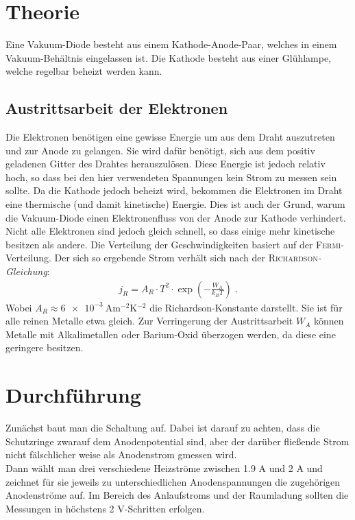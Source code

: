 \documentclass[12pt,a4paper,titlepage,headinclude,bibtotoc]{scrartcl}
\begin{document}
\cite{gerthsen}

\section{Theorie}
\label{sec:theorie}
Eine Vakuum-Diode besteht aus einem Kathode-Anode-Paar, welches in einem Vakuum-Behältnis eingelassen ist.
Die Kathode besteht aus einer Glühlampe, welche regelbar beheizt werden kann.
\subsection{Austrittsarbeit der Elektronen}
Die Elektronen benötigen eine gewisse Energie um aus dem Draht auszutreten und zur Anode zu gelangen.
Sie wird dafür benötigt, sich aus dem positiv geladenen Gitter des Drahtes herauszulösen.
Diese Energie ist jedoch relativ hoch, so dass bei den hier verwendeten Spannungen kein Strom zu messen sein sollte.
Da die Kathode jedoch beheizt wird, bekommen die Elektronen im Draht eine thermische (und damit kinetische) Energie.
Dies ist auch der Grund, warum die Vakuum-Diode einen Elektronenfluss von der Anode zur Kathode verhindert.
Nicht alle Elektronen sind jedoch gleich schnell, so dass einige mehr kinetische besitzen als andere.
Die Verteilung der Geschwindigkeiten basiert auf der \textsc{Fermi}-Verteilung.
Der sich so ergebende Strom verhält sich nach der \textsc{Richardson}\emph{-Gleichung}:
\begin{align}
	j_R=A_R\cdot T^{2}\cdot \exp\left(-\frac{W_A}{k_BT}\right)\label{eq:richardson}\; .
\end{align}
Wobei $A_R\approx \SI{6e-3}{\ampere\meter^{-2}\kelvin^{-2}}$ die Richardson-Konstante darstellt.
Sie ist für alle reinen Metalle etwa gleich.
Zur Verringerung der Austrittsarbeit $W_A$ können Metalle mit Alkalimetallen oder Barium-Oxid überzogen werden, da diese eine geringere besitzen.


                                                                                                                                                                      
\section{Durchführung}
\label{sec:durchfuehrung}
Zunächst baut man die Schaltung auf.
Dabei ist darauf zu achten, dass die Schutzringe zwarauf dem Anodenpotential sind, aber der darüber fließende Strom nicht fälschlicher weise als Anodenstrom gmessen wird.\\
Dann wählt man drei verschiedene Heizströme zwischen 1.9 A und 2 A und zeichnet für sie jeweils zu unterschiedlichen Anodenspannungen die zugehörigen Anodenströme auf.
Im Bereich des Anlaufstroms und der Raumladung sollten die Messungen in höchstens 2 V-Schritten erfolgen.
\end{document}
